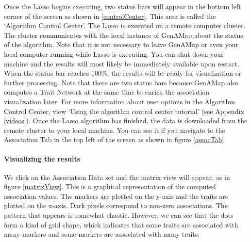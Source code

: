 \documentclass{article}
\begin{document}
Once the Lasso begins executing, two status bars will appear in the bottom left corner of the screen as shown in \ref{controlCenter}. This area is called the `Algorithm Control Center'. The Lasso is executed on a remote computer cluster. The cluster communicates with the local instance of GenAMap about the status of the algorithm. Note that it is not necessary to leave GenAMap or even your local computer running while Lasso is executing. You can shut down your machine and the results will most likely be immediately available upon restart. When the status bar reaches 100\%, the results will be ready for visualization or further processing. Note that there are two status bars because GenAMap also computes a Trait Network at the same time to enrich the association visualization later. For more information about user options in the Algorithm Control Center, view `Using the algorithm control center tutorial' (see Appendix \ref{videos}). Once the Lasso algorithm has finished, the data is downloaded from the remote cluster to your local machine. You can see it if you navigate to the Association Tab in the top left of the screen as shown in figure \ref{assocTab}. \\

\paragraph{Visualizing the results} We click on the Association Data set and the matrix view will appear, as in figure \ref{matrixView}. This is a graphical representation of the computed association values. The markers are plotted on the y-axis and the traits are plotted on the x-axis. Dark pixels correspond to non-zero associations. The pattern that appears is somewhat chaotic. However, we can see that the dots form a kind of grid shape, which indicates that some traits are associated with many markers and some markers are associated with many traits. \\
\end{document}
